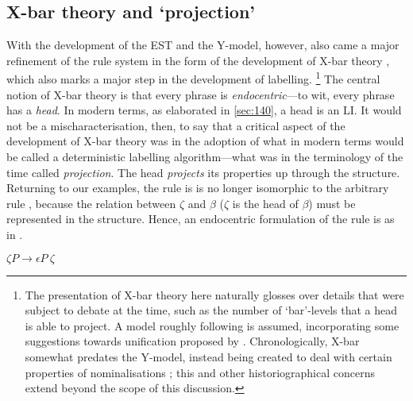 \subsection{X-bar theory and `projection'}\label{sec:230}

With the development of the EST and the Y-model, however, also came a major refinement of the rule system in the form of the development of X-bar theory \parencite{ChomskyN_1970,JackendoffR_1977}, which also marks a major step in the development of labelling.%
\footnote{The presentation of X-bar theory here naturally glosses over details that were subject to debate at the time, such as the number of `bar'-levels that a head is able to project. A model roughly following \textcite{ChomskyN_1981} is assumed, incorporating some suggestions towards unification proposed by \textcite{MuyskenP_1982}. Chronologically, X-bar somewhat predates the Y-model, instead being created to deal with certain properties of nominalisations \parencite{ChomskyN_1970}; this and other historiographical concerns extend beyond the scope of this discussion.}
The central notion of X-bar theory is that every phrase is \textit{endocentric}---to wit, every phrase has a \textit{head}. In modern terms, as elaborated in \autoref{sec:140}, a head is an LI. It would not be a mischaracterisation, then, to say that a critical aspect of the development of X-bar theory was in the adoption of what in modern terms would be called a deterministic labelling algorithm---what was in the terminology of the time called \textit{projection}. The head \textit{projects} its properties up through the structure. Returning to our examples, the rule  is is no longer isomorphic to the arbitrary rule , because the relation between $\zeta$ and $\beta$ ($\zeta$ is the head of $\beta$) must be represented in the structure. Hence, an endocentric formulation of the rule is as in .

\begin{example}\label{ex:PSrulearb3}
$\zeta P \rightarrow \epsilon P\ \zeta$
\end{example}

